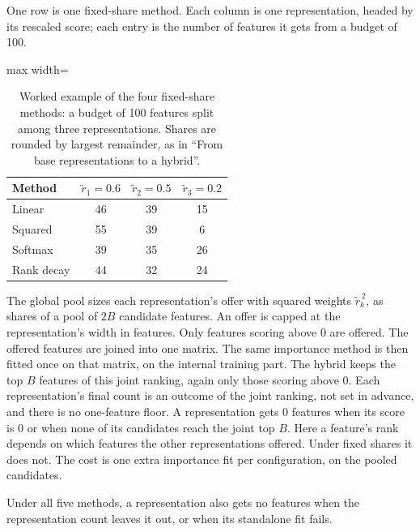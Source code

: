 One row is one fixed-share method. Each column is one representation, headed by its rescaled score; each entry is the number of features it gets from a budget of 100.
\begin{table}[htbp]
\centering
\caption[Worked example of the four fixed-share allocation methods.]{Worked example of the four fixed-share methods: a budget of 100 features split among three representations. Shares are rounded by largest remainder, as in ``From base representations to a hybrid''.}
\label{tab:alloc_example}
\begin{adjustbox}{max width=\textwidth}
\begin{tabular}{@{}lccc@{}}
\toprule
Method & $\tilde r_1 = 0.6$ & $\tilde r_2 = 0.5$ & $\tilde r_3 = 0.2$ \\
\midrule
Linear & 46 & 39 & 15 \\
Squared & 55 & 39 & 6 \\
Softmax & 39 & 35 & 26 \\
Rank decay & 44 & 32 & 24 \\
\bottomrule
\end{tabular}
\end{adjustbox}
\end{table}

The global pool sizes each representation's offer with squared weights $\tilde r_k^{\,2}$, as shares of a pool of $2B$ candidate features. An offer is capped at the representation's width in features. Only features scoring above 0 are offered. The offered features are joined into one matrix. The same importance method is then fitted once on that matrix, on the internal training part. The hybrid keeps the top $B$ features of this joint ranking, again only those scoring above 0. Each representation's final count is an outcome of the joint ranking, not set in advance, and there is no one-feature floor. A representation gets 0 features when its score is 0 or when none of its candidates reach the joint top $B$. Here a feature's rank depends on which features the other representations offered. Under fixed shares it does not. The cost is one extra importance fit per configuration, on the pooled candidates.

Under all five methods, a representation also gets no features when the representation count leaves it out, or when its standalone fit fails.

